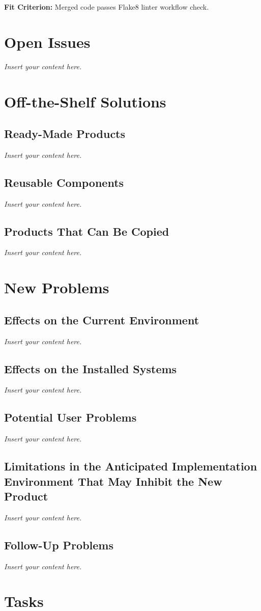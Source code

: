 \documentclass[12pt]{article}
\newcommand{\lips}{\textit{Insert your content here.}}
\begin{document}
\textbf{Fit Criterion:} Merged code passes Flake8 linter workflow check.

\section{Open Issues}
\lips

\section{Off-the-Shelf Solutions}
\subsection{Ready-Made Products}
\lips
\subsection{Reusable Components}
\lips
\subsection{Products That Can Be Copied}
\lips

\section{New Problems}
\subsection{Effects on the Current Environment}
\lips
\subsection{Effects on the Installed Systems}
\lips
\subsection{Potential User Problems}
\lips
\subsection{Limitations in the Anticipated Implementation Environment That May
Inhibit the New Product}
\lips
\subsection{Follow-Up Problems}
\lips

\section{Tasks}
\end{document}
